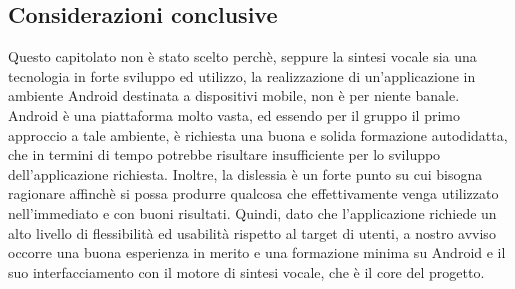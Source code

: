 \subsection{Considerazioni conclusive}

Questo capitolato non è stato scelto perchè, seppure
la sintesi vocale sia una tecnologia in forte sviluppo ed utilizzo, la realizzazione di un'applicazione in ambiente Android destinata
a dispositivi mobile, non è per niente banale. Android è una piattaforma
molto vasta, ed essendo per il gruppo il primo approccio a tale ambiente, è richiesta una buona e solida formazione autodidatta, che in termini di tempo potrebbe risultare insufficiente per lo sviluppo dell'applicazione richiesta. Inoltre, la dislessia è un forte punto su cui bisogna ragionare affinchè si possa produrre qualcosa che effettivamente venga utilizzato
nell'immediato e con buoni risultati. Quindi, dato che l'applicazione richiede un alto livello di flessibilità ed usabilità rispetto al target di utenti, a nostro avviso occorre una buona esperienza in merito e una formazione minima su Android e il suo interfacciamento con il motore di sintesi vocale, che è il core del progetto.